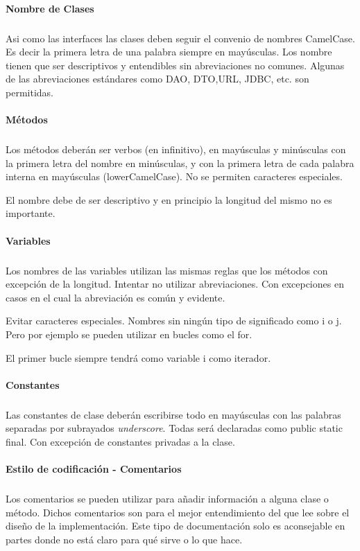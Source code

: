 \paragraph{Nombre de Clases}
\subparagraph{}
Asi como las interfaces las clases deben seguir el convenio de nombres CamelCase. Es decir la primera letra de una palabra siempre en mayúsculas. Los nombre tienen que ser descriptivos y entendibles sin abreviaciones no comunes. Algunas de las abreviaciones estándares como DAO, DTO,URL, JDBC, etc. son permitidas.

\paragraph{Métodos}
\subparagraph{}
Los métodos deberán ser verbos (en infinitivo), en mayúsculas y minúsculas con la primera letra del nombre en minúsculas, y con la primera letra de cada palabra interna en mayúsculas (lowerCamelCase). No se permiten caracteres especiales.

El nombre debe de ser descriptivo y en principio la longitud del mismo no es importante.

\paragraph{Variables}
\subparagraph{}
Los nombres de las variables utilizan las mismas reglas que los métodos con excepción de la longitud. Intentar no utilizar abreviaciones. Con excepciones en casos en el cual la abreviación es común y evidente. 

Evitar caracteres especiales. Nombres sin ningún tipo de significado como i  o j. Pero por ejemplo se pueden utilizar en bucles como el for. 

El primer bucle siempre tendrá como variable i como iterador.


\paragraph{Constantes}
\subparagraph{}
Las constantes de clase deberán escribirse todo en mayúsculas con las palabras separadas por subrayados \emph{underscore}. Todas será declaradas como public static final. Con excepción de constantes privadas a la clase.


\paragraph{Estilo de codificación - Comentarios}
\subparagraph{}
Los comentarios se pueden utilizar para añadir información a alguna clase o método. Dichos comentarios son para el mejor entendimiento del que lee sobre el diseño de la implementación. Este tipo de documentación solo es aconsejable en partes donde no está claro para qué sirve o lo que hace.



